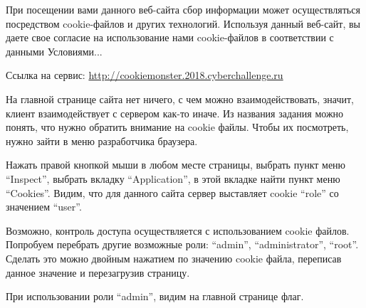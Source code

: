 
При посещении вами данного веб-сайта сбор информации может осуществляться посредством cookie-файлов и других технологий. Используя данный веб-сайт, вы даете свое согласие на использование нами cookie-файлов в соответствии с данными Условиями...

Ссылка на сервис: \url{http://cookiemonster.2018.cyberchallenge.ru}

\solutionSection

На главной странице сайта нет ничего, с чем можно взаимодействовать, значит, клиент взаимодействует с сервером как-то иначе. Из названия задания можно понять, что нужно обратить внимание на cookie файлы. Чтобы их посмотреть, нужно зайти в меню разработчика браузера.

Нажать правой кнопкой мыши в любом месте страницы, выбрать пункт меню “Inspect”, выбрать вкладку “Application”, в этой вкладке найти пункт меню “Cookies”. Видим, что для данного сайта сервер выставляет cookie “role” со значением “user”.


Возможно, контроль доступа осуществляется с использованием cookie файлов. Попробуем перебрать другие возможные роли: “admin”, “administrator”, “root”. Сделать это можно двойным нажатием по значению cookie файла, переписав данное значение и перезагрузив страницу.

При использовании роли “admin”, видим на главной странице флаг.


